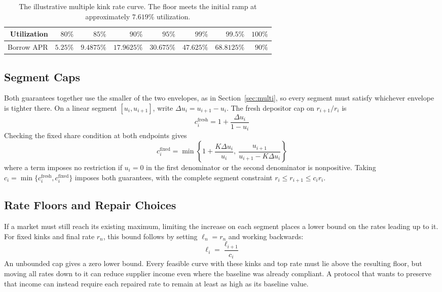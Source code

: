 \documentclass[11pt,a4paper]{article}
\begin{document}
\begin{table}[htbp]
\centering
\caption{The illustrative multiple kink rate curve. The floor meets the initial ramp at approximately $7.619\%$ utilization.}
\label{tab:multi}
\begin{tabular}{@{}rrrrrrrr@{}}
\toprule
Utilization & $80\%$ & $85\%$ & $90\%$ & $95\%$ & $99\%$ & $99.5\%$ & $100\%$ \\
\midrule
Borrow APR & $5.25\%$ & $9.4875\%$ & $17.9625\%$ & $30.675\%$ & $47.625\%$ & $68.8125\%$ & $90\%$ \\
\bottomrule
\end{tabular}
\end{table}

\subsection{Segment Caps}

Both guarantees together use the smaller of the two envelopes, as in Section~\ref{sec:multi}, so every segment must satisfy whichever envelope is tighter there. On a linear segment $[u_i,u_{i+1}]$, write $\Delta u_i=u_{i+1}-u_i$. The fresh depositor cap on $r_{i+1}/r_i$ is
\begin{equation}
c_i^{\mathrm{fresh}}=1+\frac{\Delta u_i}{1-u_i}
\end{equation}
Checking the fixed share condition at both endpoints gives
\begin{equation}
c_i^{\mathrm{fixed}}=\min\left\{
1+\frac{K\Delta u_i}{u_i},\
\frac{u_{i+1}}{u_{i+1}-K\Delta u_i}
\right\}
\end{equation}
where a term imposes no restriction if $u_i=0$ in the first denominator or the second denominator is nonpositive. Taking $c_i=\min\{c_i^{\mathrm{fresh}},c_i^{\mathrm{fixed}}\}$ imposes both guarantees, with the complete segment constraint $r_i\leq r_{i+1}\leq c_i r_i$.

\subsection{Rate Floors and Repair Choices}

If a market must still reach its existing maximum, limiting the increase on each segment places a lower bound on the rates leading up to it. For fixed kinks and final rate $r_n$, this bound follows by setting $\ell_n=r_n$ and working backwards:
\begin{equation}
\ell_i=\frac{\ell_{i+1}}{c_i}
\end{equation}
An unbounded cap gives a zero lower bound. Every feasible curve with these kinks and top rate must lie above the resulting floor, but moving all rates down to it can reduce supplier income even where the baseline was already compliant. A protocol that wants to preserve that income can instead require each repaired rate to remain at least as high as its baseline value.
\end{document}
